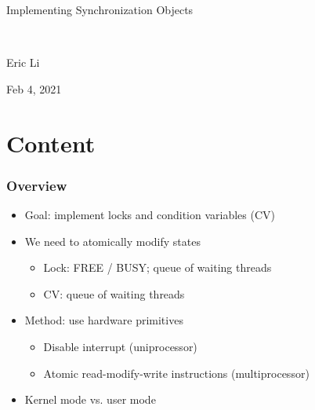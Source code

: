 \documentclass[mathserif,serif,14pt,aspectratio=169]{beamer}
\begin{document}

\begin{frame}
	\centerline{\Large Implementing Synchronization Objects}
	
	\
	
	\centerline{Eric Li}
	\centerline{Feb 4, 2021}
\end{frame}


\section{Content}

\begin{frame}
	\frametitle{Overview}
	\begin{itemize}\setlength\itemsep{0.5em}
	\item<1-> Goal: implement locks and condition variables (CV)
	\item<2-> We need to atomically modify states
		\begin{itemize}\setlength\itemsep{0.3em}
		\item<2-> Lock: FREE / BUSY; queue of waiting threads
		\item<2-> CV: queue of waiting threads
		\end{itemize}
	\item<3-> Method: use hardware primitives
		\begin{itemize}\setlength\itemsep{0.3em}
		\item<3-> Disable interrupt (uniprocessor)
		\item<3-> Atomic read-modify-write instructions (multiprocessor)
		\end{itemize}
	\item<4-> Kernel mode vs. user mode
	\end{itemize}
\end{frame}
\end{document}
